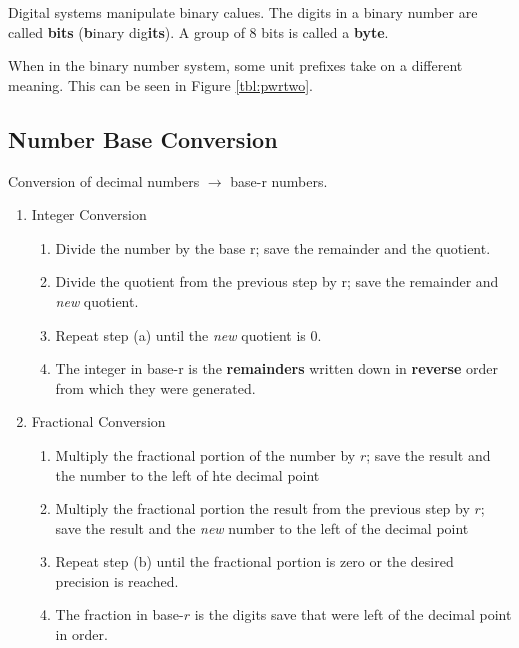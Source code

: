 \documentclass[12pt]{article}
\begin{document}
Digital systems manipulate binary calues. The digits in a binary number are called \textbf{bits}
(\textbf{b}inary dig\textbf{its}). A group of 8 bits is called a \textbf{byte}.

When in the binary number system, some unit prefixes take on a different meaning. This can
be seen in Figure \ref{tbl:pwrtwo}.

\subsection{Number Base Conversion}
\label{ssec:numberBaseConversion}

Conversion of decimal numbers $\rightarrow$ base-r numbers.

\begin{enumerate}
  \itemsep0em
  \item Integer Conversion
    \begin{enumerate}
      \itemsep0em
      \item Divide the number by the base r; save the remainder and the quotient.
      \item Divide the quotient from the previous step by r; save the remainder and \textit{new} quotient.
      \item Repeat step (a) until the \textit{new} quotient is 0.
      \item The integer in base-r is the \textbf{remainders} written down in \textbf{reverse} order from which they were generated.
    \end{enumerate}
  \item Fractional Conversion
    \begin{enumerate}
      \itemsep0em
      \item Multiply the fractional portion of the number by $r$; save the result and the number to the left of hte decimal point
      \item Multiply the fractional portion the result from the previous step by $r$; save the result and the \textit{new} number to the left of the decimal point
      \item Repeat step (b) until the fractional portion is zero or the desired precision is reached.
      \item The fraction in base-$r$ is the digits save that were left of the decimal point in order.
    \end{enumerate}
\end{enumerate}
\end{document}

